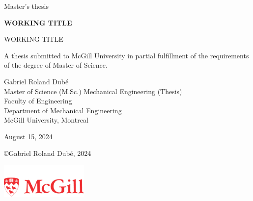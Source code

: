 \begin{titlepage}
    \thispagestyle{empty}
    \sffamily
    \vspace*{3cm}
    {\large \color{cyan}
        Master's thesis
    }

    \vspace{0.3cm}
    {\LARGE \textbf{WORKING TITLE}}

    {\Large WORKING TITLE}

    \vspace{0.2cm}
    {\large 
        A thesis submitted to McGill University in partial fulfillment of the requirements of the degree of Master of Science.

        \vspace{1 cm}
        Gabriel Roland Dubé\\
        Master of Science (M.Sc.) Mechanical Engineering (Thesis) \\
        Faculty of Engineering\\
        Department of Mechanical Engineering\\
        McGill University, Montreal


        \vspace{0.5cm}
        August 15, 2024
    }
    \vfill
    {   
        \copyright Gabriel Roland Dubé, 2024
        
    }
    \vspace{0.5cm}
    \begin{center}
        \hfill
        \includegraphics[height=1.75cm]{assets/McGill_logo.pdf}
    \end{center}
\end{titlepage}